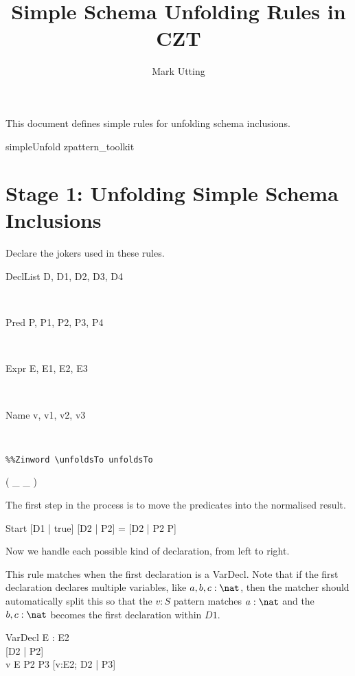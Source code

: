 \documentclass{article}
\title{Simple Schema Unfolding Rules in CZT}
\author{Mark Utting}
\begin{document}
\maketitle

This document defines simple rules for unfolding schema inclusions.

\begin{zsection}
  \SECTION simpleUnfold \parents zpattern\_toolkit
\end{zsection}

\section*{Stage 1: Unfolding Simple Schema Inclusions}

Declare the jokers used in these rules.

\begin{zedjoker}{DeclList} D, D1, D2, D3, D4 \end{zedjoker} \\
\begin{zedjoker}{Pred} P, P1, P2, P3, P4 \end{zedjoker} \\
\begin{zedjoker}{Expr} E, E1, E2, E3 \end{zedjoker} \\
\begin{zedjoker}{Name} v, v1, v2, v3 \end{zedjoker} \\

\newcommand{\unfoldsTo}{\mathrel{\leadsto}}

\begin{verbatim}
%%Zinword \unfoldsTo unfoldsTo
\end{verbatim}

\begin{zed}
  \relation ( \_ \unfoldsTo \_ )
\end{zed}

The first step in the process is to move the predicates into
the normalised result.
\begin{zedrule}{Start}
   [D1 | true] \unfoldsTo [D2 | P2]
\derives
   [D1 | P] = [D2 | P2 \land P]
\end{zedrule}

Now we handle each possible kind of declaration, from left to right.

This rule matches when the first declaration is a VarDecl.
Note that if the first declaration declares multiple variables,
like $a,b,c:\nat$, then the matcher should automatically split this
so that the $v:S$ pattern matches $a:\nat$ and the $b,c:\nat$
becomes the first declaration within $D1$.
\begin{zedrule}{VarDecl}
   \proviso E : \power E2 \\
   [D1 | true] \unfoldsTo [D2 | P2] \\
   v \in E \land P2 \iff P3
\derives
   [v:E; D1 | true] \unfoldsTo [v:E2; D2 | P3]
\end{zedrule}
\end{document}
